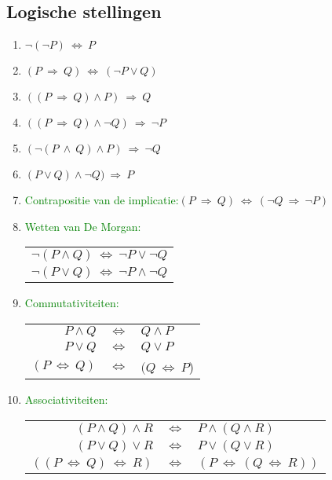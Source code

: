 \subsection{Logische stellingen} \label{logische_stellingen}
\hypertarget{logische_stellingen}{}
\begin{enumerate}%
\item $\neg(\neg P)\:\Leftrightarrow\: P$
\item $(P\:\Rightarrow\: Q) \:\Leftrightarrow\: (\neg P \vee Q)$
\item $((P \:\Rightarrow\: Q)\wedge P)\:\Rightarrow\: Q$
\item $((P \:\Rightarrow\: Q)\wedge \neg Q)\:\Rightarrow\: \neg P$
\item $(\neg(P \:\wedge\: Q)\wedge P)\:\Rightarrow\: \neg Q$
\item $(P \vee Q)\wedge\neg Q)\:\Rightarrow\:P$
\item \textcolor{green}{Contrapositie van de implicatie:}$(P\:\Rightarrow\: Q) \:\Leftrightarrow\: (\neg Q \:\Rightarrow\: \neg P)$
\item \textcolor{green}{\hypertarget{de_morgan}{Wetten van De Morgan:}}\label{de_morgan}\newline
\begin{tabular}{c}
$\neg(P\wedge Q)\:\Leftrightarrow\:\neg P \vee \neg Q $\\
$\neg(P \vee Q)\:\Leftrightarrow\:\neg P \wedge \neg Q$
\end{tabular}
\item \textcolor{green}{Commutativiteiten:}\newline
\begin{tabular}{rcl}
$P \wedge Q$ & $\Leftrightarrow $ & $Q \wedge P$\\
$P \vee Q$ & $\Leftrightarrow $ & $Q \vee P$\\
$(P \:\Leftrightarrow\: Q)$ & $\Leftrightarrow $ & $(Q \:\Leftrightarrow\: P$)\\
\end{tabular}
\item \textcolor{green}{Associativiteiten:}\newline
\begin{tabular}{rcl}
$(P \wedge Q)\wedge R$ & $\Leftrightarrow $ & $P \wedge (Q \wedge R)$\\
$(P \vee Q)\vee R$ & $\Leftrightarrow $ & $P \vee (Q \vee R)$\\
$((P \:\Leftrightarrow\: Q)\:\Leftrightarrow\: R)$ & $\Leftrightarrow $ & $(P\:\Leftrightarrow\: (Q \:\Leftrightarrow\: R))$\\

\end{tabular}
\end{enumerate}
